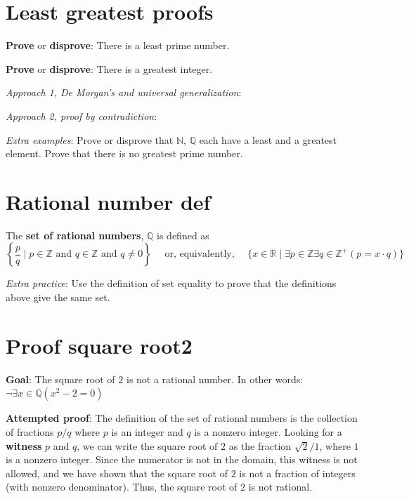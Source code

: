 \documentclass[12pt, oneside]{article}
\begin{document}
 \vfill
\section*{Least greatest proofs}


{\bf Prove} or {\bf  disprove}:  There is a least prime number.


\vfill

{\bf Prove} or {\bf  disprove}: There is a greatest integer. 

{\it Approach 1, De Morgan's and universal generalization}: 

\vfill

{\it Approach 2, proof by contradiction}: 

\vfill

\vfill

{\it Extra examples}: Prove or disprove that $\mathbb{N}$,  $\mathbb{Q}$ each have a
least and a greatest element. Prove that there is no greatest prime number.
 \vfill
\section*{Rational number def}


The {\bf set  of rational numbers}, $\mathbb{Q}$  is defined as 
\[
\left\{ \frac{p}{q} \mid p \in \mathbb{Z}  \text{ and  } q  \in \mathbb{Z} \text{ and } q \neq  0 \right\}
\text{~~~~or, equivalently,~~~~}
\{ x  \in  \mathbb{R} \mid \exists p \in \mathbb{Z}  \exists q \in \mathbb{Z}^+ ( p =  x \cdot q) \}
\]

{\it Extra practice}: Use the definition of set equality to prove that the definitions above  give the same set.

 \vfill
\section*{Proof square root2}


{\bf Goal}:  The square root of $2$ is not a rational number.  In other words: $\neg \exists x \in \mathbb{Q} ( x^2 -  2 = 0)$

{\bf Attempted proof}: The definition of the set of rational numbers is the collection of fractions $p/q$ where $p$ is an integer and $q$ is a nonzero integer. Looking for a {\bf witness} $p$ and $q$, we can write the square root of $2$ as the fraction 
$\sqrt{2 }/1$, where $1$ is a nonzero integer. Since the numerator is not in the domain, this witness is not allowed, and we have shown that the square root of $2$ is not a fraction of integers (with nonzero denominator). Thus, the square root of $2$ is not rational.
\end{document}
